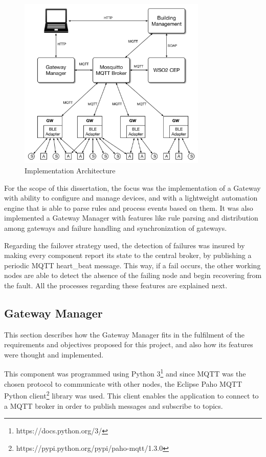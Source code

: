 \begin{figure}[H]
	\centering
	\includegraphics[width=0.8\textwidth]{figures/architecture3.png}
	\caption{Implementation Architecture}
	\label{fig:arch2}
\end{figure}

For the scope of this dissertation, the focus was the implementation of a Gateway with ability to configure and manage devices, and with a lightweight automation engine that is able to parse rules and process events based on them. It was also implemented a Gateway Manager with features like rule parsing and distribution among gateways and failure handling and synchronization of gateways.

Regarding the failover strategy used, the detection of failures was insured by making every component report its state to the central broker, by publishing a periodic MQTT heart\_beat message. This way, if a fail occurs, the other working nodes are able to detect the absence of the failing node and begin recovering from the fault. All the processes regarding these features are explained next.


\subsection{Gateway Manager}
\label{arch:gm}

This section describes how the Gateway Manager fits in the fulfilment of the requirements and objectives proposed for this project, and also how its features were thought and implemented. 


This component was programmed using Python 3\footnote{https://docs.python.org/3/} and since MQTT was the chosen protocol to communicate with other nodes, the Eclipse Paho MQTT Python client\footnote{https://pypi.python.org/pypi/paho-mqtt/1.3.0} library was used. This client enables the application to connect to a MQTT broker in order to publish messages and subscribe to topics.


